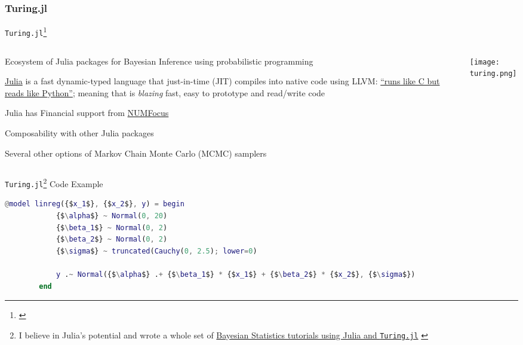 \subsubsection{Turing.jl}
\begin{frame}{\texttt{Turing.jl}\footnote{\textcite{geTuringLanguageFlexible2018}}}
	\begin{columns}
		\begin{column}{0.8\textwidth}
			\begin{vfilleditems}
				\small
				\item Ecosystem of Julia packages for Bayesian
				Inference using probabilistic programming
				\item \href{https://www.julialang.org}{Julia} is a fast
				dynamic-typed language that just-in-time (JIT)
				compiles into native code using LLVM:
				\href{https://www.nature.com/articles/d41586-019-02310-3}{``runs like C but reads like Python''};
				meaning that is \textit{blazing} fast, easy to prototype and read/write code
				\item Julia has Financial support from
				\href{https://numfocus.org/}{NUMFocus}
				\item Composability with other Julia packages
				\item Several other options of Markov Chain Monte Carlo (MCMC) samplers
			\end{vfilleditems}
		\end{column}
		\begin{column}{0.2\textwidth}
			\centering
			\texttt{[image: turing.png]}
		\end{column}
	\end{columns}
\end{frame}

\begin{frame}[fragile]{\texttt{Turing.jl}\footnote{
			I believe in Julia's potential and wrote a whole set of
			\href{https://storopoli.io/Bayesian-Julia}{
				Bayesian Statistics tutorials using Julia and
				\texttt{Turing.jl}} \parencite{storopoli2021bayesianjulia}}
		Code Example}
	\begin{lstlisting}[basicstyle=\small, language=Matlab, escapeinside=\{\}]
        @model linreg({$x_1$}, {$x_2$}, y) = begin
            {$\alpha$} ~ Normal(0, 20)
            {$\beta_1$} ~ Normal(0, 2)
            {$\beta_2$} ~ Normal(0, 2)
            {$\sigma$} ~ truncated(Cauchy(0, 2.5); lower=0)

            y .~ Normal({$\alpha$} .+ {$\beta_1$} * {$x_1$} + {$\beta_2$} * {$x_2$}, {$\sigma$})
        end
    \end{lstlisting}
\end{frame}

